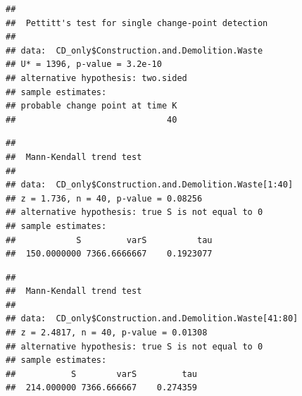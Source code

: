 \documentclass[12pt,]{article}
\newenvironment{Shaded}{\begin{snugshade}}{\end{snugshade}}
\newcommand{\KeywordTok}[1]{\textcolor[rgb]{0.13,0.29,0.53}{\textbf{#1}}}
\newcommand{\DecValTok}[1]{\textcolor[rgb]{0.00,0.00,0.81}{#1}}
\newcommand{\CommentTok}[1]{\textcolor[rgb]{0.56,0.35,0.01}{\textit{#1}}}
\newcommand{\OperatorTok}[1]{\textcolor[rgb]{0.81,0.36,0.00}{\textbf{#1}}}
\newcommand{\NormalTok}[1]{#1}
\begin{document}
\begin{verbatim}
## 
##  Pettitt's test for single change-point detection
## 
## data:  CD_only$Construction.and.Demolition.Waste
## U* = 1396, p-value = 3.2e-10
## alternative hypothesis: two.sided
## sample estimates:
## probable change point at time K 
##                              40
\end{verbatim}

\begin{Shaded}
\end{Shaded}

\begin{verbatim}
## 
##  Mann-Kendall trend test
## 
## data:  CD_only$Construction.and.Demolition.Waste[1:40]
## z = 1.736, n = 40, p-value = 0.08256
## alternative hypothesis: true S is not equal to 0
## sample estimates:
##            S         varS          tau 
##  150.0000000 7366.6666667    0.1923077
\end{verbatim}

\begin{Shaded}
\end{Shaded}

\begin{verbatim}
## 
##  Mann-Kendall trend test
## 
## data:  CD_only$Construction.and.Demolition.Waste[41:80]
## z = 2.4817, n = 40, p-value = 0.01308
## alternative hypothesis: true S is not equal to 0
## sample estimates:
##           S        varS         tau 
##  214.000000 7366.666667    0.274359
\end{verbatim}

\begin{Shaded}
\end{Shaded}
\end{document}
